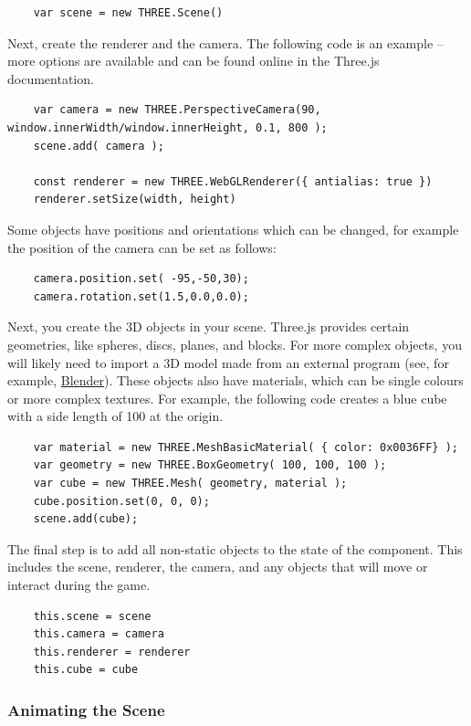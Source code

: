 \documentclass{article}
\begin{document}
	\begin{verbatim}
	var scene = new THREE.Scene()
	\end{verbatim}
	
	Next, create the renderer and the camera. The following code is an example -- more options are available and can be found online in the Three.js documentation. 
	
	\begin{verbatim}
	var camera = new THREE.PerspectiveCamera(90, window.innerWidth/window.innerHeight, 0.1, 800 );
	scene.add( camera );
	
	const renderer = new THREE.WebGLRenderer({ antialias: true })
	renderer.setSize(width, height)
	\end{verbatim}	
	
	Some objects have positions and orientations which can be changed, for example the position of the camera can be set as follows:
	
	\begin{verbatim}
	camera.position.set( -95,-50,30);
	camera.rotation.set(1.5,0.0,0.0);
	\end{verbatim}			
	
	Next, you create the 3D objects in your scene. Three.js provides certain geometries, like spheres, discs, planes, and blocks. For more complex objects, you will likely need to import a 3D model made from an external program (see, for example, \href{https://www.blender.org/}{Blender}). These objects also have materials, which can be single colours or more complex textures. For example, the following code creates a blue cube with a side length of 100 at the origin.  
	
	\begin{verbatim}
	var material = new THREE.MeshBasicMaterial( { color: 0x0036FF} );
	var geometry = new THREE.BoxGeometry( 100, 100, 100 );
	var cube = new THREE.Mesh( geometry, material );
	cube.position.set(0, 0, 0);
	scene.add(cube);
	\end{verbatim}
	
	The final step is to add all non-static objects to the state of the component. This includes the scene, renderer, the camera, and any objects that will move or interact during the game. 
	
	\begin{verbatim}
	this.scene = scene
	this.camera = camera
	this.renderer = renderer
	this.cube = cube
	\end{verbatim}
	
		\subsubsection{Animating the Scene}
	
\end{document}
